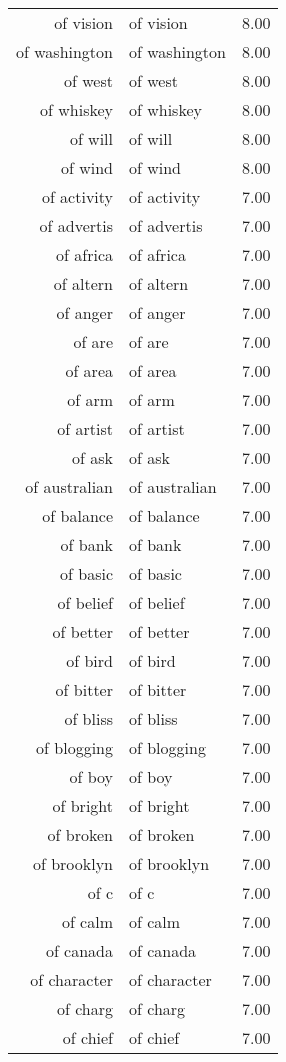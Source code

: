 \begin{table}[ht]
\begin{tabular}{rlr}
  of vision & of vision & 8.00 \\ 
  of washington & of washington & 8.00 \\ 
  of west & of west & 8.00 \\ 
  of whiskey & of whiskey & 8.00 \\ 
  of will & of will & 8.00 \\ 
  of wind & of wind & 8.00 \\ 
  of activity & of activity & 7.00 \\ 
  of advertis & of advertis & 7.00 \\ 
  of africa & of africa & 7.00 \\ 
  of altern & of altern & 7.00 \\ 
  of anger & of anger & 7.00 \\ 
  of are & of are & 7.00 \\ 
  of area & of area & 7.00 \\ 
  of arm & of arm & 7.00 \\ 
  of artist & of artist & 7.00 \\ 
  of ask & of ask & 7.00 \\ 
  of australian & of australian & 7.00 \\ 
  of balance & of balance & 7.00 \\ 
  of bank & of bank & 7.00 \\ 
  of basic & of basic & 7.00 \\ 
  of belief & of belief & 7.00 \\ 
  of better & of better & 7.00 \\ 
  of bird & of bird & 7.00 \\ 
  of bitter & of bitter & 7.00 \\ 
  of bliss & of bliss & 7.00 \\ 
  of blogging & of blogging & 7.00 \\ 
  of boy & of boy & 7.00 \\ 
  of bright & of bright & 7.00 \\ 
  of broken & of broken & 7.00 \\ 
  of brooklyn & of brooklyn & 7.00 \\ 
  of c & of c & 7.00 \\ 
  of calm & of calm & 7.00 \\ 
  of canada & of canada & 7.00 \\ 
  of character & of character & 7.00 \\ 
  of charg & of charg & 7.00 \\ 
  of chief & of chief & 7.00 \\ 

\end{tabular}
\end{table}
